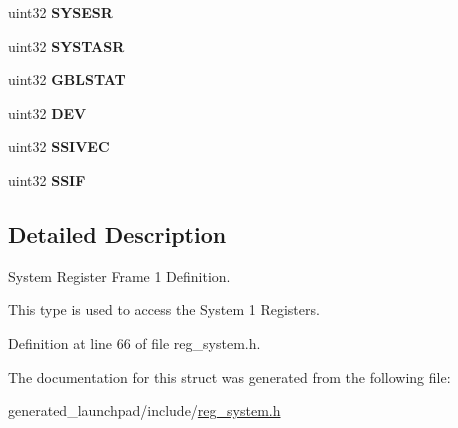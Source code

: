 \begin{DoxyCompactItemize}
\item 
\mbox{\label{structsystemBase1_a5346ca6662d205b73fd568a4a76a9ca7}} 
uint32 {\bfseries S\+Y\+S\+E\+SR}
\item 
\mbox{\label{structsystemBase1_a282e2bcb3e0aee5164b9f502ebd20ca8}} 
uint32 {\bfseries S\+Y\+S\+T\+A\+SR}
\item 
\mbox{\label{structsystemBase1_a0d2ad92539770283def8e875969f3ecf}} 
uint32 {\bfseries G\+B\+L\+S\+T\+AT}
\item 
\mbox{\label{structsystemBase1_ad4b4ccf3e527b462b211be03022acd78}} 
uint32 {\bfseries D\+EV}
\item 
\mbox{\label{structsystemBase1_a97fae1348ca4de0bc9f59815275989e9}} 
uint32 {\bfseries S\+S\+I\+V\+EC}
\item 
\mbox{\label{structsystemBase1_aac002bd127f1b06ebf191707be241681}} 
uint32 {\bfseries S\+S\+IF}
\end{DoxyCompactItemize}


\subsection{Detailed Description}
System Register Frame 1 Definition. 

This type is used to access the System 1 Registers. 

Definition at line 66 of file reg\+\_\+system.\+h.



The documentation for this struct was generated from the following file\+:\begin{DoxyCompactItemize}
\item 
generated\+\_\+launchpad/include/\mbox{\hyperlink{reg__system_8h}{reg\+\_\+system.\+h}}\end{DoxyCompactItemize}
